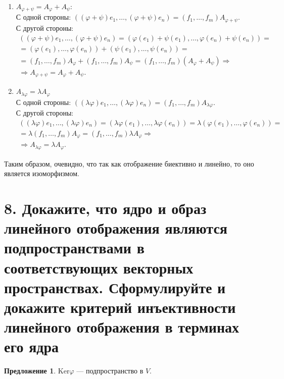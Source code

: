 \documentclass[a4paper, 12pt]{article}
\newcommand{\Ker}{\text{Ker}}
\begin{document}
\vspace{-9mm}
\begin{enumerate}
\itemsep=-0.3em
\item $A_{\varphi + \psi} = A_\varphi + A_\psi$: \\
С одной стороны: $((\varphi + \psi)e_1, \ldots, (\varphi + \psi)e_n) = (f_1, \ldots, f_m)A_{\varphi + \psi}$. \\
С другой стороны:
\vspace{-3mm}
\begin{gather*}
((\varphi + \psi)e_1, \ldots, (\varphi + \psi)e_n) = (\varphi(e_1) + \psi(e_1), \ldots, \varphi(e_n) + \psi(e_n)) = \\ = (\varphi(e_1), \ldots, \varphi(e_n)) + (\psi(e_1), \ldots, \psi(e_n)) = \\
= (f_1, \ldots, f_m)A_\varphi + (f_1, \ldots, f_m)A_\psi = (f_1, \ldots, f_m)(A_\varphi + A_\psi) \Rightarrow \\
\Rightarrow A_{\varphi + \psi} = A_\varphi + A_\psi.
\end{gather*}
\item $A_{\lambda\varphi} = \lambda A_\varphi$ \\
С одной стороны: $((\lambda\varphi) e_1, \ldots, (\lambda\varphi) e_n) = (f_1, \ldots, f_m)A_{\lambda\varphi}$. \\
С другой стороны:
\vspace{-3mm}
\begin{gather*}
((\lambda\varphi)e_1, \ldots, (\lambda\varphi)e_n) = (\lambda\varphi(e_1), \ldots, \lambda\varphi(e_n)) = \lambda(\varphi(e_1), \ldots, \varphi(e_n)) = \\ = \lambda (f_1, \ldots, f_m)A_{\varphi} = (f_1, \ldots, f_m)\lambda A_\varphi \Rightarrow \\ \Rightarrow A_{\lambda\varphi} = \lambda A_\varphi.
\end{gather*}
\end{enumerate}

Таким образом, очевидно, что так как отображение биективно и линейно, то оно является изоморфизмом.

\section*{8. Докажите, что ядро и образ линейного отображения являются подпространствами в соответствующих векторных пространствах. Сформулируйте и докажите критерий инъективности линейного отображения в терминах его ядра}
\textbf{Предложение 1}. $\Ker\varphi$ --- подпространство в $V$.
\end{document}
